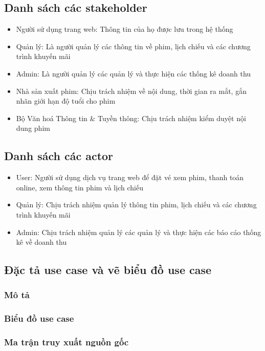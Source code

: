 \documentclass[a4paper, 12pt]{article}
\begin{document}
    \subsection{Danh sách các stakeholder}
    \begin{itemize}
        \item Người sử dụng trang web: Thông tin của họ được lưu trong hệ thống
        \item Quản lý: Là người quản lý các thông tin về phim, lịch chiếu và các chương trình khuyến mãi
        \item Admin: Là người quản lý các quản lý và thực hiện các thống kê doanh thu 
        \item Nhà sản xuất phim: Chịu trách nhiệm về nội dung, thời gian ra mắt, gắn nhãn giới hạn độ tuổi cho phim
        \item Bộ Văn hoá Thông tin \& Tuyền thông: Chịu trách nhiệm kiểm duyệt nội dung phim
    \end{itemize}

    \subsection{Danh sách các actor}
    \begin{itemize}
        \item User: Người sử dụng dịch vụ trang web để đặt vé xem phim, thanh toán online, xem thông tin phim và lịch chiếu
        \item Quản lý: Chịu trách nhiệm quản lý thông tin phim, lịch chiếu và các chương trình khuyến mãi
        \item Admin: Chịu trách nhiệm quản lý các quản lý và thực hiện các báo cáo thống kê về doanh thu 
    \end{itemize}

    \subsection{Đặc tả use case và vẽ biểu đồ use case}
    \subsubsection{Mô tả}
    \subsubsection{Biểu đồ use case}
    \subsubsection{Ma trận truy xuất nguồn gốc}
\end{document}
